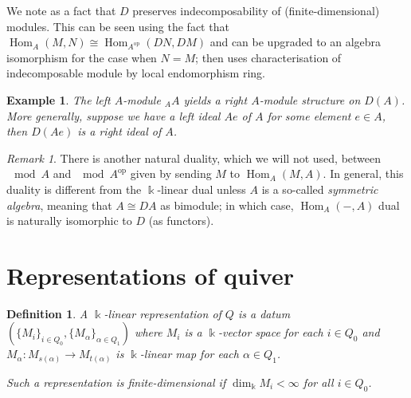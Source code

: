 \documentclass[11pt,a4paper]{article}
\makeatletter
\numberwithin{equation}{section}
\renewenvironment{proof}[1][\proofname]{\par
    \pushQED{\qed}%
    \normalfont \topsep0\p@\@plus6\p@ \labelsep1em\relax
    \trivlist
    \item[\hskip\labelsep\indent
        \bfseries #1]\ignorespaces
    \mbox{}
}{
    \popQED\endtrivlist\@endpefalse
}
\theoremstyle{all}
\newtheorem{lemma}[theorem]{Lemma}
\newtheorem{example}[theorem]{Example}
\newtheorem{definition}[theorem]{Definition}
\theoremstyle{remark}
\newtheorem{remark}[theorem]{Remark}
\newcommand{\Hom}{\operatorname{Hom}\nolimits}
\newcommand{\op}{\mathrm{op}}
\newcommand{\defn}[1]{\textsl{\color{darkblue} #1}}
\makeatother
\begin{document}
We note as a fact that $D$ preserves indecomposability of (finite-dimensional) modules.  This can be seen using the fact that $\Hom_A(M,N)\cong \Hom_{A^\op}(DN,DM)$ and can be upgraded to an algebra isomorphism for the case when $N=M$; then uses characterisation of indecomposable module by local endomorphism ring.


\begin{example}
The \emph{left} $A$-module ${}_AA$ yields a right $A$-module structure on $D(A)$.
More generally, suppose we have a left ideal $Ae$ of $A$ for some element $e\in A$, then $D(Ae)$ is a right ideal of $A$.
\end{example}

\begin{remark}
There is another natural duality, which we will not used, between $\mod A$ and $\mod A^\op$ given by sending $M$ to $\Hom_A(M,A)$.
In general, this duality is different from the $\Bbbk$-linear dual unless $A$ is a so-called \emph{symmetric algebra}, meaning that $A\cong DA$ as bimodule; in which case, $\Hom_A(-,A)$ dual is naturally isomorphic to $D$ (as functors).
\end{remark}


\section{Representations of quiver}

\begin{definition}
A $\Bbbk$-linear \defn{representation} of $Q$ is a datum $(\{M_i\}_{i\in Q_0}, \{M_{\alpha}\}_{\alpha\in Q_1})$ where $M_i$ is a $\Bbbk$-vector space for each $i\in Q_0$ and $M_\alpha: M_{s(\alpha)}\to M_{t(\alpha)}$ is $\Bbbk$-linear map for each $\alpha\in Q_1$.

Such a representation is \defn{finite-dimensional} if $\dim_{\Bbbk} M_i<\infty$ for all $i\in Q_0$.
\end{definition}
\end{document}
